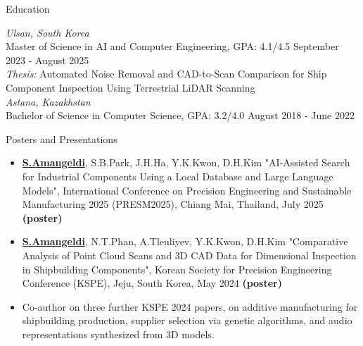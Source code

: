 \documentclass{resume} %
\begin{document}
\vspace{-0.3cm}
\begin{rSection}{Education}
\vspace{-0.05cm}

{\bf \href{https://www.timeshighereducation.com/world-university-rankings/university-ulsan}{\color{blue}{University of Ulsan}}} \hfill \textit{Ulsan, South Korea} \\
{Master of Science in AI and Computer Engineering, GPA: 4.1/4.5} \hfill {September 2023 - August 2025} \\
{\it Thesis:} Automated Noise Removal and CAD-to-Scan Comparison for Ship Component Inspection Using Terrestrial LiDAR Scanning \href{https://oak.ulsan.ac.kr/handle/2021.oak/20336}{\faPaperclip} \\
{\bf \href{https://www.timeshighereducation.com/world-university-rankings/nazarbayev-university}{\color{blue}{Nazarbayev University}}} \hfill \textit{Astana, Kazakhstan}\\
{Bachelor of Science in Computer Science, GPA: 3.2/4.0} \hfill {August 2018 - June 2022}
\end{rSection}


\vspace{-0.3cm}
\begin{rSection}{Posters and Presentations}
\vspace{-0.05cm}
\begin{itemize}
    \itemsep -7.5pt {}
    \item \underline{\textbf{S.Amangeldi}}, S.B.Park, J.H.Ha, Y.K.Kwon, D.H.Kim "AI-Assisted Search for Industrial Components Using a Local Database and Large Language Models", International Conference on Precision Engineering and Sustainable Manufacturing 2025 (PRESM2025), Chiang Mai, Thailand, July 2025
    \textbf{(poster)}

    \item \underline{\textbf{S.Amangeldi}}, N.T.Phan, A.Tleuliyev, Y.K.Kwon, D.H.Kim "Comparative Analysis of Point Cloud Scans and 3D CAD Data for Dimensional Inspection in Shipbuilding Components", Korean Society for Precision Engineering Conference (KSPE), Jeju, South Korea, May 2024
    \href{https://www.dbpia.co.kr/journal/articleDetail?nodeId=NODE11798461}{\faPaperclip} \textbf{(poster)}

    \item Co-author on three further KSPE 2024 papers, on additive manufacturing for shipbuilding production, supplier selection via genetic algorithms, and audio representations synthesized from 3D models.
\end{itemize}

\end{rSection}
\end{document}
